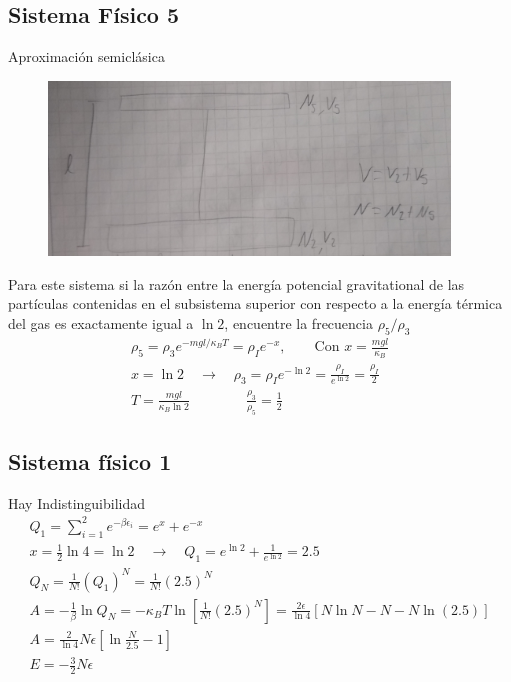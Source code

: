 \documentclass{article}
\begin{document}
\subsection{Sistema Físico 5 }
Aproximación semiclásica 
\begin{figure}[H]
  \begin{center}
    \includegraphics[width=0.95\textwidth]{sistema_fisico_5.jpg}
  \end{center}
\end{figure}
Para este sistema si la razón entre la energía potencial gravitational de las partículas contenidas en el subsistema superior con respecto a la energía térmica del gas es exactamente igual a $ \ln 2  $, encuentre la frecuencia $ \rho_5/\rho_3 $ 
\begin{gather*}
   \rho_5 = \rho_3 e ^ {- mgl / \kappa_B T } = \rho_I e ^ {-x }, \qquad \text{Con } x = \frac{m g l }{\kappa_B } \\
   x = \ln 2 \quad \rightarrow \quad \rho_3 = \rho_I e ^ {-\ln 2 } = \frac{\rho_I }{ e ^ {\ln 2 }} = \frac{\rho_I }{2 } \\
   T = \frac{m g l }{\kappa_B \ln 2 } \qquad \qquad \frac{\rho_3 }{\rho_5 } = \frac{1}{2}
\end{gather*}

\subsection{Sistema físico 1 }
Hay Indistinguibilidad 
\begin{gather*}
  Q_1 = \displaystyle\sum_{i = 1 }^{2 } e ^ {- \beta\epsilon_i } = e ^ {x } + e ^ {-x }\\ 
  x = \frac{1}{2} \ln 4 = \ln 2 \quad \rightarrow \quad  Q_1 = e ^ {\ln 2 } + \frac{1}{e ^ {\ln 2 }} = 2.5  \\
  Q_N = \frac{1}{N! } (Q_1)^N = \frac{1}{N! } (2.5)^N \\
  A = - \frac{1}{\beta} \ln Q_N = - \kappa_B  T \ln \left[\frac{1}{N! } (2.5)^N \right] = \frac{2\epsilon }{\ln 4 }  [N \ln N - N - N \ln (2.5  )] \\
  A = \frac{2 }{\ln 4 }N \epsilon \left[\ln \frac{N }{2.5 } - 1 \right]\\
   E = - \frac{3 }{2}N \epsilon
\end{gather*}
\end{document}
